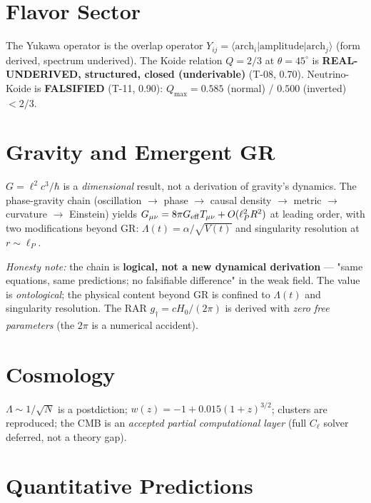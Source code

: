 \documentclass[11pt,a4paper]{article}
\begin{document}
\section{Flavor Sector}
\label{sec:flavor}

The Yukawa operator is the overlap operator $Y_{ij}=\langle
\mathrm{arch}_i|\mathrm{amplitude}|\mathrm{arch}_j\rangle$ (form derived, spectrum
underived). The Koide relation $Q=2/3$ at $\theta=45^\circ$ is \textbf{REAL-UNDERIVED,
structured, closed (underivable)} (T-08, 0.70). Neutrino-Koide is \textbf{FALSIFIED}
(T-11, 0.90): $Q_{\max}=0.585$ (normal) / $0.500$ (inverted) $<2/3$.

\section{Gravity and Emergent GR}
\label{sec:gravity}

$G=\ell^2c^3/\hbar$ is a \emph{dimensional} result, not a derivation of gravity's
dynamics. The phase-gravity chain (oscillation $\to$ phase $\to$ causal density $\to$
metric $\to$ curvature $\to$ Einstein) yields
$G_{\mu\nu}=8\pi G_{\rm eff}T_{\mu\nu}+O(\ell_P^2 R^2)$ at leading order, with two
modifications beyond GR: $\Lambda(t)=\alpha/\sqrt{V(t)}$ and singularity resolution at
$r\sim\ell_P$.

\emph{Honesty note:} the chain is \textbf{logical, not a new dynamical derivation} —
"same equations, same predictions; no falsifiable difference" in the weak field. The value
is \emph{ontological}; the physical content beyond GR is confined to $\Lambda(t)$ and
singularity resolution. The RAR $g_\dagger=cH_0/(2\pi)$ is derived with \emph{zero free
parameters} (the $2\pi$ is a numerical accident).

\section{Cosmology}
\label{sec:cosmology}

$\Lambda\sim1/\sqrt{N}$ is a postdiction; $w(z)=-1+0.015(1+z)^{3/2}$; clusters are
reproduced; the CMB is an \emph{accepted partial computational layer} (full $C_\ell$ solver
deferred, not a theory gap).

\section{Quantitative Predictions}
\label{sec:predictions}
\end{document}
